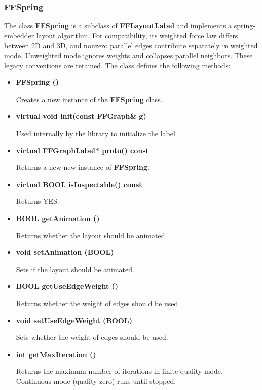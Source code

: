 \subsubsection{FFSpring}
\label{ffspring}

The class {\bf FFSpring} is a subclass of {\bf FFLayoutLabel} and
implements a spring-embedder layout algorithm. For compatibility, its
weighted force law differs between 2D and 3D, and nonzero parallel edges
contribute separately in weighted mode. Unweighted mode ignores weights
and collapses parallel neighbors. These legacy conventions are retained. The class defines the
following methods:

\begin{itemize}

\item{\bf  FFSpring ()}

Creates a new instance of the {\bf FFSpring} class.

\item{\bf virtual void init(const FFGraph\& g)}

Used internally by the library to initialize the label.   

\item{\bf  virtual FFGraphLabel* proto() const}

Returns a new new instance of {\bf FFSpring}.
  
\item{\bf  virtual BOOL isInspectable() const}

Returns YES.

\item{\bf  BOOL    getAnimation ()}

Returns whether the layout should be animated.

\item{\bf  void    setAnimation (BOOL)}

Sets if the layout should be animated.

\item{\bf  BOOL    getUseEdgeWeight ()}

Returns whether the weight of edges should be used.

\item{\bf  void    setUseEdgeWeight (BOOL)}

Sets whether the weight of edges should be used.

\item{\bf  int     getMaxIteration ()}

Returns the maximum number of iterations in finite-quality mode.
Continuous mode (quality zero) runs until stopped.


\end{itemize}
